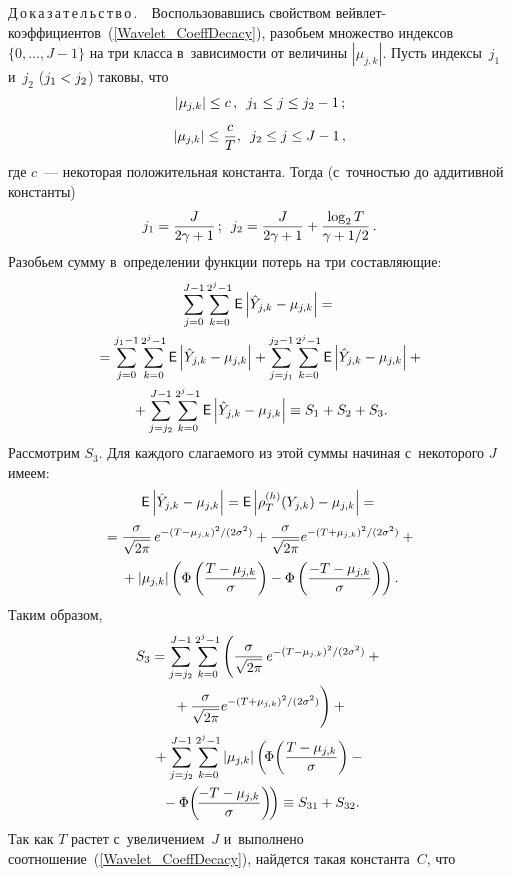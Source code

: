 \begin{multicols}{2}
\noindent
Д\,о\,к\,а\,з\,а\,т\,е\,л\,ь\,с\,т\,в\,о\,.\ \ 
Воспользовавшись свойством вейв\-лет-ко\-эф\-фи\-ци\-ен\-тов~(\ref{Wavelet_CoeffDecacy}), 
разобьем множество индексов $\{0,\ldots,J-1\}$ на три класса в~за\-ви\-си\-мости от величины $|\mu_{j,k}|$. 
Пусть индексы~$j_1$ и~$j_2$ ($j_1\hm< j_2$) таковы, что
$$
|\mu_{j,k}|\le c\,, \enskip j_1\le j\le j_2-1\,;
$$
$$
|\mu_{j,k}|\le \displaystyle\frac{\displaystyle c\mathstrut}{\displaystyle T\mathstrut}, \enskip  j_2\le j \le J-1\,,
$$
где $c$~--- некоторая положительная константа. Тогда (с~точ\-ностью до аддитивной константы)
$$
j_1=\displaystyle\frac{\displaystyle J\mathstrut}{\displaystyle 2\gamma+1\mathstrut}\,;\enskip 
j_2=\displaystyle\frac{\displaystyle J\mathstrut}{\displaystyle 2\gamma+1\mathstrut}+\displaystyle\frac{\displaystyle \log_2 T\mathstrut}{\displaystyle \gamma+1/2\mathstrut}\,.
$$
Разобьем сумму в~определении функции потерь на три со\-став\-ля\-ющие:
\begin{multline}
\label{Risk_Decomposition}
\sum\limits_{j=0}^{J-1}\sum\limits_{k=0}^{2^{j}-1}{\sf E}\left|\hat{Y}_{j,k}-\mu_{j,k}\right|={}\\
{}=
\sum\limits_{j=0}^{j_1-1}\sum\limits_{k=0}^{2^{j}-1}{\sf E}\left|\hat{Y}_{j,k}-\mu_{j,k}\right|+
\sum\limits_{j=j_1}^{j_2-1}\sum\limits_{k=0}^{2^{j}-1}{\sf E}\left|\hat{Y}_{j,k}-\mu_{j,k}\right|+{}\\
{}+
\sum\limits_{j=j_2}^{J-1}\sum\limits_{k=0}^{2^{j}-1}{\sf E}\left|\hat{Y}_{j,k}-\mu_{j,k}\right|\equiv S_1+S_2+S_3.
\end{multline}
Рассмотрим $S_3$. Для каж\-до\-го сла\-га\-емо\-го из этой суммы начиная с~некоторого $J$ имеем:
\begin{multline*}
{\sf E}\left|\hat{Y}_{j,k}-\mu_{j,k}\right|={\sf E}\left|\rho_{T}^{(h)}(Y_{j,k})-\mu_{j,k}\right|={}\\
{}=\displaystyle\frac{\displaystyle \sigma\mathstrut}{\displaystyle \sqrt{2\pi}\mathstrut}\, e^{-(T-\mu_{j,k})^2/({2\sigma^2})}+
\displaystyle\frac{\displaystyle \sigma\mathstrut}{\displaystyle \sqrt{2\pi}\mathstrut}e^{-{(T+\mu_{j,k})^2}/({2\sigma^2})}+{}
\\
{}+|\mu_{j,k}|\left(\Phi\left(\displaystyle\frac{\displaystyle T-\mu_{j,k}\mathstrut}{\displaystyle \sigma\mathstrut}\right)-\Phi\left(\displaystyle\frac{\displaystyle -T-\mu_{j,k}\mathstrut}{\displaystyle \sigma\mathstrut}\right)\right).
\end{multline*}
Таким образом,
\begin{multline*}
S_3=\sum\limits_{j=j_2}^{J-1}\sum\limits_{k=0}^{2^j-1}
\left(\displaystyle\frac{\displaystyle \sigma\mathstrut}{\displaystyle \sqrt{2\pi}\mathstrut}\, e^{-{(T-\mu_{j,k})^2}/({2\sigma^2})}+{}\right.\\
\left.{}+\displaystyle\frac{\displaystyle \sigma\mathstrut}{\displaystyle \sqrt{2\pi}\mathstrut}e^{-{(T+\mu_{j,k})^2}/({2\sigma^2})}\right)+{}\\
{}+
\sum\limits_{j=j_2}^{J-1} \sum\limits_{k=0}^{2^j-1}|\mu_{j,k}|
\left(\!\Phi\!\left(\displaystyle\frac{\displaystyle T-\mu_{j,k}\mathstrut}{\displaystyle \sigma\mathstrut}\right)-{}\right.\\
\left.{}-
\Phi\!\left(\!\displaystyle\frac{\displaystyle -T-\mu_{j,k}\mathstrut}{\displaystyle \sigma\mathstrut}\right)\!\right)\equiv
S_{31}+S_{32}.
\end{multline*}
Так как $T$ рас\-тет с~увеличением~$J$ и~выполнено соотношение~(\ref{Wavelet_CoeffDecacy}), 
найдется такая константа~$C$, что


\end{multicols}
